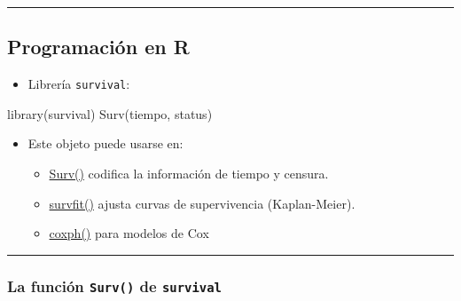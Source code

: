 \documentclass[
]{article}
\newenvironment{Shaded}{\begin{snugshade}}{\end{snugshade}}
\newcommand{\FunctionTok}[1]{\textcolor[rgb]{0.28,0.35,0.67}{#1}}
\newcommand{\NormalTok}[1]{\textcolor[rgb]{0.00,0.23,0.31}{#1}}
\providecommand{\tightlist}{%
  \setlength{\itemsep}{0pt}\setlength{\parskip}{0pt}}
\begin{document}
\begin{center}\rule{0.5\linewidth}{0.5pt}\end{center}

\subsection{Programación en R}\label{programaciuxf3n-en-r}

\begin{itemize}
\tightlist
\item
  Librería \texttt{survival}:
\end{itemize}

\begin{Shaded}
\begin{Highlighting}[]
\FunctionTok{library}\NormalTok{(survival)}
\FunctionTok{Surv}\NormalTok{(tiempo, status)}
\end{Highlighting}
\end{Shaded}

\begin{itemize}
\tightlist
\item
  Este objeto puede usarse en:

  \begin{itemize}
  \tightlist
  \item
    \href{https://www.rdocumentation.org/packages/survival/versions/3.5-7/topics/Surv}{Surv()}
    codifica la información de tiempo y censura.
  \item
    \href{https://www.rdocumentation.org/packages/survival/versions/3.8-3/topics/survfit.formula}{survfit()}
    ajusta curvas de supervivencia (Kaplan-Meier).
  \item
    \href{https://www.rdocumentation.org/packages/survival/versions/3.5-7/topics/coxph}{coxph()}
    para modelos de Cox
  \end{itemize}
\end{itemize}

\begin{center}\rule{0.5\linewidth}{0.5pt}\end{center}

\subsubsection{\texorpdfstring{La función \texttt{Surv()} de
\texttt{survival}}{La función Surv() de survival}}\label{la-funciuxf3n-surv-de-survival}
\end{document}
